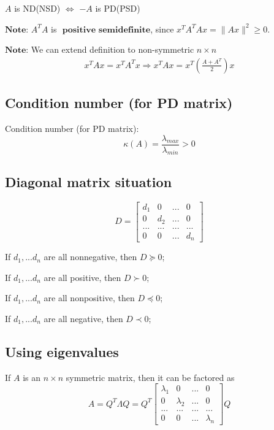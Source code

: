 \documentclass[11pt]{elegantbook}
\begin{document}
$A$ is ND(NSD) $\Leftrightarrow$ $-A$ is PD(PSD)

$\textbf{Note:}$ $A^TA$ is $\textbf{ positive semidefinite}$, since $x^TA^TAx=\|Ax\|^2\geq 0$.

$\textbf{Note:}$ We can extend definition to non-symmetric $n\times n$
\begin{equation}
    \begin{aligned}
        x^TAx=x^TA^Tx \Rightarrow x^TAx=x^T(\frac{A+A^T}{2})x
    \end{aligned}
    \nonumber
\end{equation}

\subsection{Condition number (for PD matrix)}
Condition number (for PD matrix):$$\kappa (A)=\frac{\lambda_{max}}{\lambda_{min}}>0$$











\subsection{Diagonal matrix situation}
$$D=\begin{bmatrix}
    d_1&0&... &0\\0&d_2&...&0\\...&...&...&...\\0&0&...&d_n
\end{bmatrix}$$
\begin{lemma}
    If $d_1,...d_n$ are all nonnegative, then $D\succeq 0$;

    If $d_1,...d_n$ are all positive, then $D\succ 0$;
    
    If $d_1,...d_n$ are all nonpositive, then $D\preceq 0$;
    
    If $d_1,...d_n$ are all negative, then $D\prec 0$;
\end{lemma}

\subsection{Using eigenvalues}
If $A$ is an $n \times n$ symmetric matrix, then it can be factored as
    $$A=Q^T\Lambda Q=Q^T
    \begin{bmatrix}
        \lambda_1&0&... &0\\
        0&\lambda_2&...&0\\
        ...&...&...&...\\
        0&0&...&\lambda_n
    \end{bmatrix}Q$$
\end{document}
